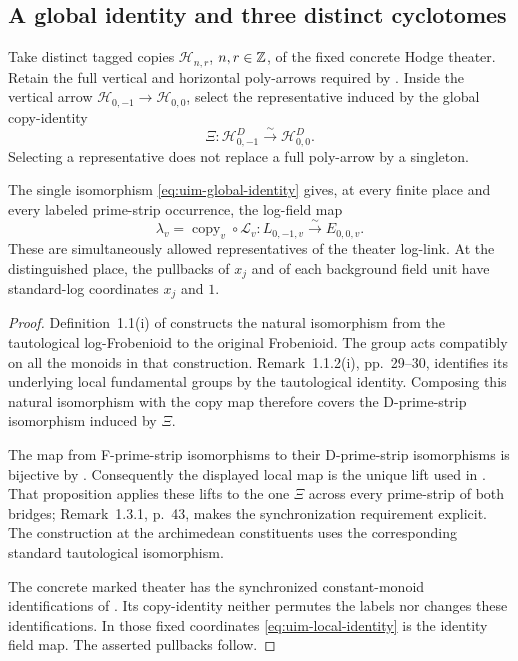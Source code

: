 \subsection{A global identity and three distinct cyclotomes}

Take distinct tagged copies
\(\mathcal H_{n,r}\), \(n,r\in\mathbb Z\), of the fixed
concrete Hodge theater. Retain the full vertical and
horizontal poly-arrows required by
\cite[Definition~3.8(iii), pp.~113--114]{IUT3}.
Inside the vertical arrow
\(\mathcal H_{0,-1}\to\mathcal H_{0,0}\), select the
representative induced by the global copy-identity
\begin{equation}\label{eq:uim-global-identity}
 \Xi:\mathcal H^D_{0,-1}\xrightarrow{\sim}
                         \mathcal H^D_{0,0}.
\end{equation}
Selecting a representative does not replace a full
poly-arrow by a singleton.

\begin{proposition}
\label{prop:uim-synchronized}
The single isomorphism \eqref{eq:uim-global-identity}
gives, at every finite place and every labeled
prime-strip occurrence, the log-field map
\begin{equation}\label{eq:uim-local-identity}
       \lambda_v=\operatorname{copy}_v\circ\mathcal L_v:
           L_{0,-1,v}\xrightarrow{\sim}E_{0,0,v}.
\end{equation}
These are simultaneously allowed representatives
of the theater log-link. At the distinguished place,
the pullbacks of \(x_j\) and of each background field
unit have standard-log coordinates \(x_j\) and \(1\).
\end{proposition}
\begin{proof}
Definition~1.1(i) of \cite{IUT3} constructs the natural
isomorphism from the tautological log-Frobenioid to
the original Frobenioid. The group acts compatibly
on all the monoids in that construction.
Remark~1.1.2(i), pp.~29--30, identifies its underlying
local fundamental groups by the tautological identity.
Composing this natural isomorphism with the copy map
therefore covers the D-prime-strip isomorphism
induced by \(\Xi\).

The map from F-prime-strip isomorphisms to their
D-prime-strip isomorphisms is bijective by
\cite[Corollary~5.3(ii), p.~144]{IUT1}.
Consequently the displayed local map is the unique
lift used in
\cite[Proposition~1.3(i), p.~42]{IUT3}.
That proposition applies these lifts to the one
\(\Xi\) across every prime-strip of both bridges;
Remark~1.3.1, p.~43, makes the synchronization
requirement explicit. The construction at the
archimedean constituents uses the corresponding
standard tautological isomorphism.

The concrete marked theater has the synchronized
constant-monoid identifications of
\cite[Corollary~4.6(iii), p.~138]{IUT2}.
Its copy-identity neither permutes the labels nor
changes these identifications. In those fixed
coordinates \eqref{eq:uim-local-identity} is the
identity field map. The asserted pullbacks follow.
\end{proof}

